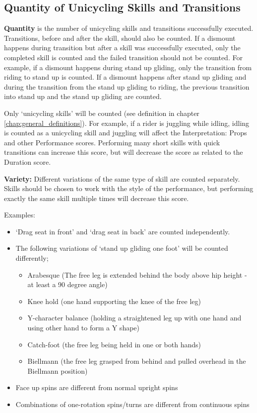 \subsection{Quantity of Unicycling Skills and Transitions}
\textbf{Quantity} is the number of unicycling skills and transitions successfully executed.
Transitions, before and after the skill, should also be counted.
If a dismount happens during transition but after a skill was successfully executed, only the completed skill is counted and the failed transition should not be counted.
For example, if a dismount happens during stand up gliding, only the transition from riding to stand up is counted.
If a dismount happens after stand up gliding and during the transition from the stand up gliding to riding, the previous transition into stand up and the stand up gliding are counted.

Only `unicycling skills' will be counted (see definition in chapter \ref{chap:general_definitions}).
For example, if a rider is juggling while idling, idling is counted as a unicycling skill and juggling will affect the Interpretation: Props and other Performance scores.
Performing many short skills with quick transitions can increase this score, but will decrease the score as related to the Duration score.

\textbf{Variety:} Different variations of the same type of skill are counted separately.
Skills should be chosen to work with the style of the performance, but performing exactly the same skill multiple times will decrease this score.

Examples:
\begin{itemize}
\item `Drag seat in front' and `drag seat in back' are counted independently.
\item The following variations of `stand up gliding one foot' will be counted differently;
	\begin{itemize}
 	\item Arabesque (The free leg is extended behind the body above hip height - at least a 90 degree angle)
	\item Knee hold (one hand supporting the knee of the free leg)
	\item Y-character balance (holding a straightened leg up with one hand and using other hand to form a Y shape)
	\item Catch-foot (the free leg being held in one or both hands)
	\item Biellmann (the free leg grasped from behind and pulled overhead in the Biellmann position)
	\end{itemize}
\item Face up spins are different from normal upright spins
\item Combinations of one-rotation spins/turns are different from continuous spins
\end{itemize}

